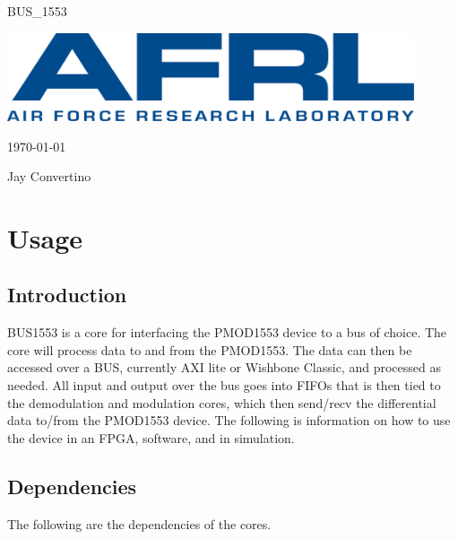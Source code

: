 \begin{titlepage}
  \begin{center}

  {\Huge BUS\_1553}

  \vspace{25mm}

  \includegraphics[width=0.90\textwidth,height=\textheight,keepaspectratio]{img/AFRL.png}

  \vspace{25mm}

  \today

  \vspace{15mm}

  {\Large Jay Convertino}

  \end{center}
\end{titlepage}

\tableofcontents

\newpage

\section{Usage}

\subsection{Introduction}

\par
BUS1553 is a core for interfacing the PMOD1553 device to a bus of choice. The core will process data to and from the PMOD1553.
The data can then be accessed over a BUS, currently AXI lite or Wishbone Classic, and processed as needed. All input and output
over the bus goes into FIFOs that is then tied to the demodulation and modulation cores, which then send/recv the differential data
to/from the PMOD1553 device. The following is information on how to use the device in an FPGA, software, and in simulation.

\subsection{Dependencies}

\par
The following are the dependencies of the cores.

